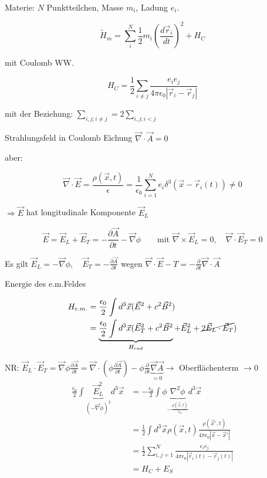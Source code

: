 Materie: \(N\) Punktteilchen, Masse \(m_i\), Ladung \(e_i\). 

\[\tilde H_m = \sum_i^N \frac{1}{2}m_i (\frac{d\vec r_i}{dt})^2 + H_C\]

mit Coulomb WW.

\[H_C = \frac{1}{2}\sum_{i\neq j} \frac{e_ie_j}{4\pi\epsilon_0|\vec r_i-\vec r_j|}\]

mit der Beziehung: \(\sum_{i,j;i\neq j} = 2\sum_{i,j;i<j}\)

Strahlungsfeld in Coulomb Eichung \(\vec \nabla\cdot\vec A = 0\)

aber:

\[ \vec \nabla\cdot\vec E = \frac{\rho (\vec x,t)}{\epsilon} = \frac{1}{\epsilon_0}\sum_{i=1}^N e_i\delta^3(\vec x-\vec r_i(t))\neq 0\]

\(\Rightarrow \vec E\) hat longitudinale Komponente \(\vec E_L\)

\[\vec E = \vec E_L + \vec E_T = -\frac{\partial \vec A}{\partial t}-\vec \nabla\phi\qquad\text{mit }\vec\nabla\times\vec E_L = 0,\quad\vec\nabla\cdot\vec E_T = 0\]


Es gilt \(\boxed{\vec E_L = -\vec \nabla\phi,\quad \vec E_T = -\frac{\partial \vec A}{\partial t}} \) wegen \(\vec \nabla\cdot\vec E-T = -\frac{\partial }{\partial t}\vec \nabla\cdot\vec A \)

Energie des e.m.Feldes

\begin{align}
H_{e.m.} &= \frac{\epsilon_0}{2}\int d^3\vec x(\vec E^2+c^2\vec B^2)\\
&=\underbrace{ \frac{\epsilon_0}{2}\int d^3\vec x(\vec E^2_T+c^2\vec B^2 }_{H_{rad}} + \vec E_L^2+\cancel{2\vec E_L\cdot\vec E_T})
\end{align}

NR: \(\vec E_L\cdot\vec E_T = \vec\nabla\phi\frac{\partial\vec A}{\partial t} = \vec\nabla\cdot(\phi\frac{\partial\vec A}{\partial t}) - \phi\frac{\partial}{\partial t}\underbrace{\vec \nabla\vec A}_{=0} \rightarrow  \) Oberflächenterm \(\rightarrow 0\)
\begin{align} 
\frac{\epsilon_0}{2} \int \underbrace{ \vec E^2_L}_{(-\vec\nabla\phi)^2}d^3\vec x &= -\frac{\epsilon_0}{2} \int\phi\underbrace{\nabla^2\phi}_{-\frac{\rho(\vec x,t)}{\epsilon_0}}d^3\vec x\\
&= \frac{1}{2}\int d^3\vec x \rho(\vec x,t) \frac{\rho(\vec x',t)}{4\pi\epsilon_0|\vec x-\vec x'|} \\
&=  \frac{1}{2} \sum_{i,j=1}^N \frac{e_ie_j}{4\pi\epsilon_0|\vec r_i(t)-\vec r_j(t)|}\\
&= H_C+E_S
\end{align}


